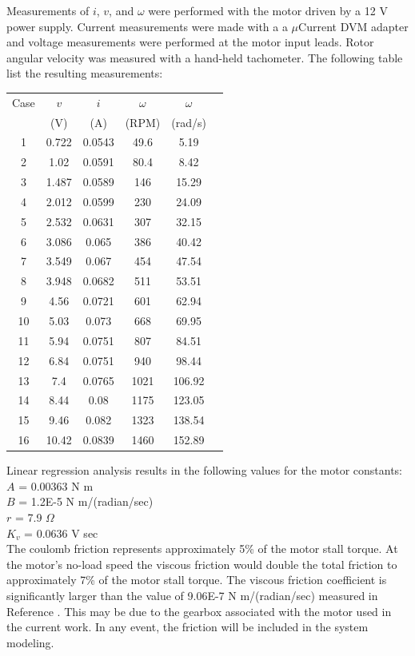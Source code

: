 \documentclass[12pt,letterpaper]{article}
\begin{document}
\begin{appendices}
Measurements of $i$, $v$, and $\omega$ were performed with the motor driven by a 12 V power supply.  Current measurements were made with a  a $\mu$Current DVM adapter and voltage measurements were 
performed at the motor input leads.  Rotor angular velocity was measured with a hand-held tachometer.  The following table list the resulting measurements:

\begin{tabular}{|c|c|c|c|cl}
\hline
Case & $v$ & $i$ & $\omega$ & $\omega$ \\
      & (V) &  (A) & (RPM) & (rad/s) \\
\hline
1	& 0.722	& 0.0543	& 49.6	& 5.19 \\
2	& 1.02	& 0.0591	& 80.4	& 8.42 \\
3	& 1.487	& 0.0589	& 146	& 15.29 \\
4	& 2.012	& 0.0599	& 230	& 24.09 \\
5	& 2.532	& 0.0631	& 307	& 32.15 \\
6	& 3.086	& 0.065	& 386	& 40.42 \\
7	& 3.549	& 0.067	& 454	& 47.54 \\
8	& 3.948	& 0.0682	& 511	& 53.51 \\
9	& 4.56	& 0.0721	& 601	& 62.94 \\
10	& 5.03	& 0.073	& 668	& 69.95 \\
11	& 5.94	& 0.0751	& 807	& 84.51 \\
12	& 6.84	& 0.0751	& 940	& 98.44 \\
13	& 7.4	        & 0.0765	& 1021	& 106.92 \\
14	& 8.44	& 0.08	& 1175	& 123.05 \\
15	& 9.46	& 0.082	& 1323	& 138.54 \\
16	& 10.42	& 0.0839	& 1460	& 152.89 \\
\hline
\end{tabular}

Linear regression analysis results in the following values for the motor constants:\\
$A$ = 0.00363 N m\\
$B$ = 1.2E-5 N m/(radian/sec)\\
$r$ = 7.9 $\Omega$\\
$K_{v}$ = 0.0636 V sec\\

The coulomb friction represents approximately 5\% of the 
motor stall torque.  At the motor's no-load speed the viscous friction would double the total friction to 
approximately 7\% of the motor stall torque.  The viscous friction coefficient is significantly larger than
the value of 9.06E-7 N m/(radian/sec) measured in Reference \cite{twoWheeled}.  This may be due to
the gearbox associated with the motor used in the current work.  In any event, the friction will be included
in the system modeling.\\


\end{appendices}
\end{document}
